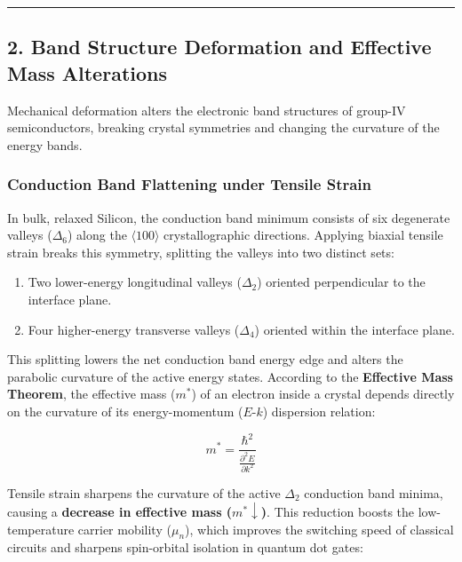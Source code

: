 \documentclass[
]{article}
\providecommand{\tightlist}{%
  \setlength{\itemsep}{0pt}\setlength{\parskip}{0pt}}
\begin{document}
\begin{center}\rule{0.5\linewidth}{0.5pt}\end{center}

\subsection{2. Band Structure Deformation and Effective Mass
Alterations}\label{band-structure-deformation-and-effective-mass-alterations}

Mechanical deformation alters the electronic band structures of group-IV
semiconductors, breaking crystal symmetries and changing the curvature
of the energy bands.

\subsubsection{Conduction Band Flattening under Tensile
Strain}\label{conduction-band-flattening-under-tensile-strain}

In bulk, relaxed Silicon, the conduction band minimum consists of six
degenerate valleys (\(\Delta_6\)) along the \(\langle 100 \rangle\)
crystallographic directions. Applying biaxial tensile strain breaks this
symmetry, splitting the valleys into two distinct sets:

\begin{enumerate}
\def\labelenumi{\arabic{enumi}.}
\tightlist
\item
  Two lower-energy longitudinal valleys (\(\Delta_2\)) oriented
  perpendicular to the interface plane.
\item
  Four higher-energy transverse valleys (\(\Delta_4\)) oriented within
  the interface plane.
\end{enumerate}

This splitting lowers the net conduction band energy edge and alters the
parabolic curvature of the active energy states. According to the
\textbf{Effective Mass Theorem}, the effective mass (\(m^*\)) of an
electron inside a crystal depends directly on the curvature of its
energy-momentum (\(E\text{-}k\)) dispersion relation:

\[m^* = \frac{\hbar^2}{\frac{\partial^2 E}{\partial k^2}}\]

Tensile strain sharpens the curvature of the active \(\Delta_2\)
conduction band minima, causing a \textbf{decrease in effective mass
(\(m^* \downarrow\))}. This reduction boosts the low-temperature carrier
mobility (\(\mu_n\)), which improves the switching speed of classical
circuits and sharpens spin-orbital isolation in quantum dot gates:
\end{document}
